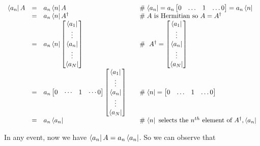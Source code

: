 \documentclass[11pt, oneside]{article}   	%
\begin{document}
\begin{equation*}
\begin{array}{rcll}
 \bra{a_n} A
&=& a_n \bra{n} A  
    & \quad \mathrel{\#} \bra{a_n}   =  a_n \begin{bmatrix} 0 & \hdots & 1 & \hdots 0 \end{bmatrix} = a_n \bra{n}    \\
&=& a_n \bra{n} A^{\dagger}
    & \quad \mathrel{\#} \text{$A$ is Hermitian so $A = A^{\dagger}$}    \\
&=& a_n \bra{n} \begin{bmatrix} \bra{a_1}  \\  \vdots \\ \bra{a_n} \\ \vdots \\  \bra{a_N}  \end{bmatrix}      
    & \quad \mathrel{\#}  \ A^{\dagger} =  \begin{bmatrix} \bra{a_1}  \\  \vdots \\ \bra{a_n} \\ \vdots \\  \bra{a_N}  \end{bmatrix}  \\
&=& a_n \begin{bmatrix} 0 & \cdots & 1 & \cdots 0 \end{bmatrix}  \begin{bmatrix} \bra{a_1}  \\  \vdots \\ \bra{a_n} \\ \vdots \\  \bra{a_N}  \end{bmatrix}  
    & \quad \mathrel{\#}  \bra{n}  = \begin{bmatrix} 0 & \hdots & 1 & \hdots 0 \end{bmatrix}  \\
&=& a_n \bra{a_n} 
    & \quad \mathrel{\#}  \bra{n} \text{ selects the $n^{th}$ element of $A^{\dagger}, \bra{a_n}$}
\end{array}
\end{equation*}

\bigskip
\noindent
In any event, now we have $\bra{a_n} A = a_n \bra{a_n}$. So we can observe that 
\end{document}
